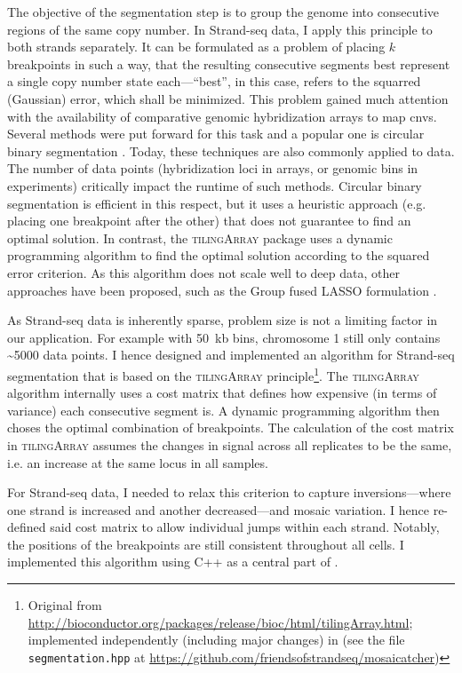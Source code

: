 The objective of the segmentation step is to group the genome into consecutive regions of
the same copy number. In Strand-seq data, I apply this principle to both strands
separately. It can be formulated as a problem of placing $k$
breakpoints in such a way, that the resulting consecutive segments best
represent a single copy number state each---``best'', in this case, refers to
the squarred (Gaussian) error, which shall be minimized. This problem gained much attention with the
availability of comparative genomic hybridization arrays to map \acp{cnv}.
Several methods were put forward for this task and a popular one is circular
binary segmentation \citep{Olshen2004,Venkatraman2007}. Today, these techniques
are also commonly applied to \mps data. The number of data points (hybridization
loci in arrays, or genomic bins in \mps experiments) critically impact the
runtime of such methods. Circular binary segmentation is efficient in this
respect, but it uses a heuristic approach (e.g. placing one breakpoint after the
other) that does not guarantee to find an optimal solution. In contrast, the
\textsc{tilingArray} \citep{Huber2006} package uses a dynamic programming
algorithm to find the optimal solution according to the squared error criterion.
As this algorithm does not scale well to deep \mps data, other approaches have
been proposed, such as the Group fused LASSO formulation \citep{Bleakley2011}.

As Strand-seq data is inherently sparse, problem size is not a limiting factor
in our application. For example with 50~kb bins, chromosome 1 still only
contains \textasciitilde5000 data points. I hence designed and implemented an
algorithm for Strand-seq segmentation that is based on the \textsc{tilingArray}
principle\footnote{Original from \url{http://bioconductor.org/packages/release/bioc/html/tilingArray.html};
    implemented independently (including major changes) in \mc (see the file
    \texttt{segmentation.hpp} at \url{https://github.com/friendsofstrandseq/mosaicatcher})}.
The \textsc{tilingArray} algorithm internally uses a cost matrix that defines
how expensive (in terms of variance) each consecutive segment is. A dynamic
programming algorithm then choses the optimal combination of breakpoints. The
calculation of the cost matrix in \textsc{tilingArray} assumes the changes in
signal across all replicates to be the same, i.e. an increase at the same locus
in all samples.

For Strand-seq data, I needed to relax this criterion to capture
inversions---where one strand is increased and another decreased---and mosaic
variation. I hence re-defined said cost matrix to allow individual jumps within
each strand. Notably, the positions of the breakpoints are still consistent
throughout all cells. I implemented this algorithm using C++ as a central part of \mc.







